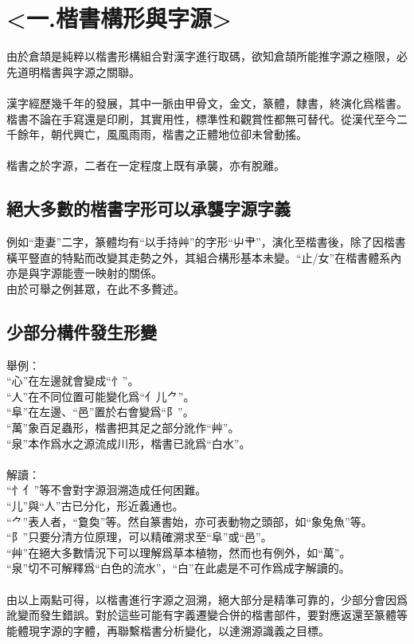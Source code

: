 \documentclass{article}
\begin{document}
\section{<一.楷書構形與字源>}

由於倉頡是純粹以楷書形構組合對漢字進行取碼，欲知倉頡所能推字源之極限，必先道明楷書與字源之關聯。\\
\\
漢字經歷幾千年的發展，其中一脈由甲骨文，金文，篆體，隸書，終演化爲楷書。楷書不論在手寫還是印刷，其實用性，標準性和觀賞性都無可替代。從漢代至今二千餘年，朝代興亡，風風雨雨，楷書之正體地位卻未曾動搖。\\
\\
楷書之於字源，二者在一定程度上既有承襲，亦有脫離。\\

\subsection{絕大多數的楷書字形可以承襲字源字義}
例如“疌妻”二字，篆體均有“以手持艸”的字形“屮肀”，演化至楷書後，除了因楷書橫平豎直的特點而改變其走勢之外，其組合構形基本未變。“止/女”在楷書體系內亦是與字源能壹一映射的關係。\\
由於可舉之例甚眾，在此不多贅述。\\

\subsection{少部分構件發生形變}
舉例：\\
“心”在左邊就會變成“忄”。\\
“人”在不同位置可能變化爲“亻儿⺈”。\\
“阜”在左邊、“邑”置於右會變爲“阝”。\\
“萬”象百足蟲形，楷書把其足之部分訛作“艸”。\\
“泉”本作爲水之源流成川形，楷書已訛爲“白水”。\\
\\
解讀：\\
“忄亻”等不會對字源洄溯造成任何困難。\\
“儿”與“人”古已分化，形近義通也。\\
“⺈”表人者，“敻奐”等。然自篆書始，亦可表動物之頭部，如“象兔魚”等。\\
“阝”只要分清方位原理，可以精確溯求至“阜”或“邑”。\\
“艸”在絕大多數情況下可以理解爲草本植物，然而也有例外，如“萬”。\\
“泉”切不可解釋爲“白色的流水”，“白”在此處是不可作爲成字解讀的。\\
\\
由以上兩點可得，以楷書進行字源之洄溯，絕大部分是精準可靠的，少部分會因爲訛變而發生錯誤。對於這些可能有字義遷變合併的楷書部件，要對應返還至篆體等能體現字源的字體，再聯繫楷書分析變化，以達溯源識義之目標。\\
\\
\end{document}
